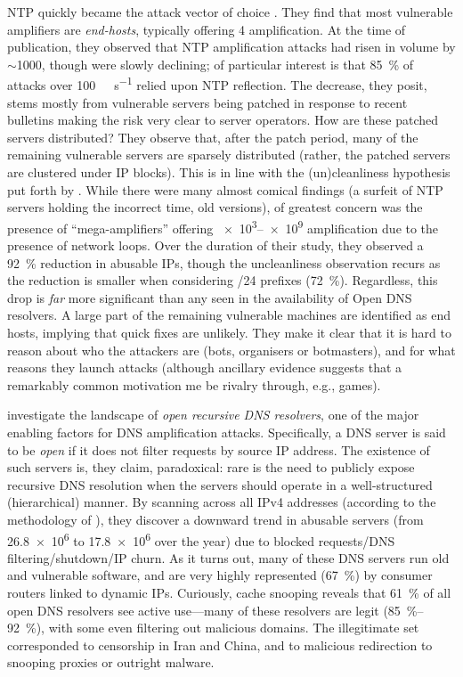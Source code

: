 NTP quickly became the attack vector of choice \cite{DBLP:conf/imc/CzyzKGPBK14}.
They find that most vulnerable amplifiers are \emph{end-hosts}, typically offering \qty{4}{\times} amplification.
At the time of publication, they observed that NTP amplification attacks had risen in volume by $\sim$\qty{1000}{\times}, though were slowly declining; of particular interest is that \qty{85}{\percent} of attacks over \qty{100}{\giga\bit\per\second} relied upon NTP reflection.
The decrease, they posit, stems mostly from vulnerable servers being patched in response to recent bulletins making the risk very clear to server operators.
How are these patched servers distributed?
They observe that, after the patch period, many of the remaining vulnerable servers are sparsely distributed (rather, the patched servers are clustered under IP blocks).
This is in line with the (un)cleanliness hypothesis put forth by \textcite{DBLP:conf/imc/CollinsSFJWSK07}.
While there were many almost comical findings (a surfeit of NTP servers holding the incorrect time, old versions), of greatest concern was the presence of ``mega-amplifiers'' offering \SIrange{e3}{e9}{\times} amplification due to the presence of network loops.
Over the duration of their study, they observed a \SI{92}{\percent} reduction in abusable IPs, though the uncleanliness observation recurs as the reduction is smaller when considering /24 prefixes (\SI{72}{\percent}).
Regardless, this drop is \emph{far} more significant than any seen in the availability of Open DNS resolvers.
A large part of the remaining vulnerable machines are identified as end hosts, implying that quick fixes are unlikely.
They make it clear that it is hard to reason about who the attackers are (bots, organisers or botmasters), and for what reasons they launch attacks (although ancillary evidence suggests that a remarkably common motivation me be rivalry through, e.g., games).

\Textcite{DBLP:conf/imc/KuhrerHBRH15} investigate the landscape of \emph{open recursive DNS resolvers}, one of the major enabling factors for DNS amplification attacks.
Specifically, a DNS server is said to be \emph{open} if it does not filter requests by source IP address.
The existence of such servers is, they claim, paradoxical: rare is the need to publicly expose recursive DNS resolution when the servers should operate in a well-structured (hierarchical) manner.
By scanning across all IPv4 addresses (according to the methodology of \textcite{DBLP:conf/uss/DurumericWH13}), they discover a downward trend in abusable servers (from \num{26.8e6} to \num{17.8e6} over the year) due to blocked requests/DNS filtering/shutdown/IP churn.
As it turns out, many of these DNS servers run old and vulnerable software, and are very highly represented (\SI{67}{\percent}) by consumer routers linked to dynamic IPs.
Curiously, cache snooping reveals that \SI{61}{\percent} of all open DNS resolvers see active use---many of these resolvers are legit (\SIrange{85}{92}{\percent}), with some even filtering out malicious domains.
The illegitimate set corresponded to censorship in Iran and China, and to malicious redirection to snooping proxies or outright malware.

